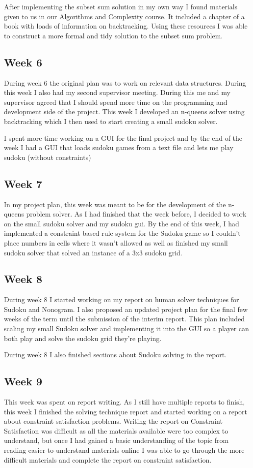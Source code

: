 \documentclass{article}
\begin{document}
After implementing the subset sum solution in my own way I found materials given to us in our Algorithms and Complexity course. It included a chapter of a book with loads of information on backtracking. Using these resources I was able to construct a more formal and tidy solution to the subset sum problem.

\subsection{Week 6}
During week 6 the original plan was to work on relevant data structures. During this week I also had my second supervisor meeting. During this me and my supervisor agreed that I should spend more time on the programming and development side of the project. This week I developed an n-queens solver using backtracking which I then used to start creating a small sudoku solver.

I spent more time working on a GUI for the final project and by the end of the week I had a GUI that loads sudoku games from a text file and lets me play sudoku (without constraints)

\subsection{Week 7}
In my project plan, this week was meant to be for the development of the n-queens problem solver. As I had finished that the week before, I decided to work on the small sudoku solver and my sudoku gui. By the end of this week, I had implemented a constraint-based rule system for the Sudoku game so I couldn't place numbers in cells where it wasn't allowed as well as finished my small sudoku solver that solved an instance of a 3x3 sudoku grid.

\subsection{Week 8}
During week 8 I started working on my report on human solver techniques for Sudoku and Nonogram. I also proposed an updated project plan for the final few weeks of the term until the submission of the interim report. This plan included scaling my small Sudoku solver and implementing it into the GUI so a player can both play and solve the sudoku grid they're playing.

During week 8 I also finished sections about Sudoku solving in the report.

\subsection{Week 9}
This week was spent on report writing. As I still have multiple reports to finish, this week I finished the solving technique report and started working on a report about constraint satisfaction problems. Writing the report on Constraint Satisfaction was difficult as all the materials available were too complex to understand, but once I had gained a basic understanding of the topic from reading easier-to-understand materials online I was able to go through the more difficult materials and complete the report on constraint satisfaction.
\end{document}
